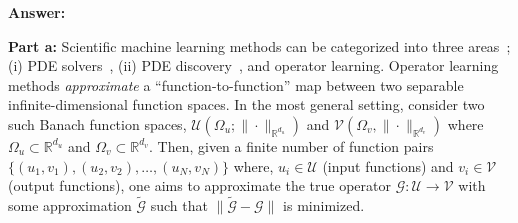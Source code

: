 \documentclass[12pt]{exam}
\def\R{\mathbb{R}}
\def\U{\mathcal{U}}
\def\V{\mathcal{V}}
\def\G{\mathcal{G}}
\begin{document}
\begin{questions}
%
{\bf Answer:}

{\bf Part a:} Scientific machine learning methods can be categorized into three areas~\citep{boulle2024mathematical}; (i) PDE solvers~\citep{raissi2019physics}, (ii) PDE discovery~\citep{brunton2016discovering}, and operator learning. Operator learning methods \emph{approximate} a ``function-to-function'' map between two separable infinite-dimensional function spaces. In the most general setting, consider two such Banach function spaces, $\U(\Omega_u; \|\cdot\|_{\R^{d_u}})$ and $\V(\Omega_v, \|\cdot\|_{\R^{d_v}})$ where $\Omega_u \subset \R^{d_u}$ and $\Omega_v \subset \R^{d_v}$. Then, given a finite number of function pairs $\{(u_1, v_1), (u_2, v_2), \dots, (u_N, v_N)\}$ where, $u_i \in \U$ (input functions) and $v_i \in \V$ (output functions), one aims to approximate the true operator $\G: \U \rightarrow \V$ with some approximation $\tilde{\G}$ such that $\|\tilde{\G} - \G \|$ is minimized.


\end{questions}
\end{document}
